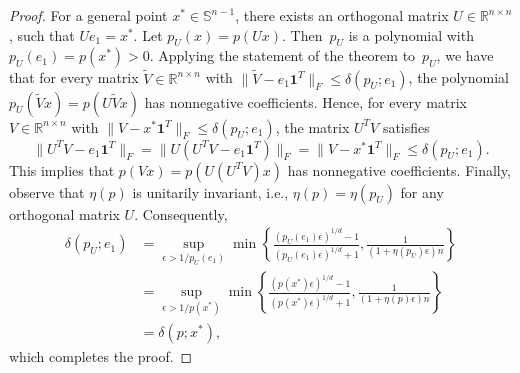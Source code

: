 \documentclass[12pt]{article}
\newcommand{\reals}{\mathbb{R}}
\newcommand{\DiSOSL}{\text{NC}}
\newcommand{\cone}{\operatornamewithlimits{cone}}
\newcommand{\mbS}{\mathbb{S}}
\newcommand{\mcV}{\mathcal{V}}
\theoremstyle{remark}
\begin{document}
\begin{proof}
For a general point $x^*\in \mbS^{n-1}$, there exists an orthogonal matrix $U\in\reals^{n\times n}$, such that $Ue_1=x^*$. Let  $p_U(x)=p(Ux)$. Then~$p_U$ is a polynomial with $p_U(e_1)=p(x^*)>0$. Applying the statement of the theorem to~$p_U$, we have that for every matrix  $\tilde{V}\in\reals^{n\times n}$ with $\|\tilde{V}-e_1\mathbf{1}^T\|_{F}\le \delta(p_U;e_1)$, the polynomial $p_U(\tilde{V}x)=p(U\tilde{V}x)$ has nonnegative coefficients. Hence, for every matrix $V\in\reals^{n\times n}$ with $\|V-x^*\mathbf{1}^T\|_F\le \delta(p_U;e_1)$, the matrix $U^TV$ satisfies
\[\|U^TV-e_1\mathbf{1}^T\|_{F}=\|U(U^TV-e_1\mathbf{1}^T)\|_F=\|V-x^*\mathbf{1}^T\|_F\le \delta(p_U;e_1).\]
This implies that $p(Vx)=p(U(U^TV)x)$ has nonnegative coefficients. Finally, observe that $\eta(p)$ is unitarily invariant, i.e., $\eta(p)=\eta(p_U)$ for any orthogonal matrix $U$. Consequently,
\[\begin{aligned}
\delta(p_U;e_1)
    &=\sup_{\epsilon>1/p_U(e_1)}\min\left\{\frac{(p_U(e_1)\epsilon)^{1/d}-1}{(p_U(e_1)\epsilon)^{1/d}+1},\frac{1}{(1+\eta(p_U)\epsilon)n}\right\}\\
    &=\sup_{\epsilon>1/p(x^*)}\min\left\{\frac{(p(x^*)\epsilon)^{1/d}-1}{( p(x^*)\epsilon)^{1/d}+1},\frac{1}{(1+\eta(p)\epsilon)n}\right\}\\
    &=\delta(p;x^*),
\end{aligned}\]
which completes the proof.
\end{proof}


\end{document}
